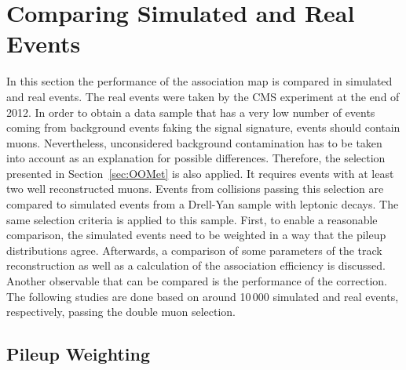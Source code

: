 \chapter{Comparing Simulated and Real Events \label{sec:DC}}

In this section the performance of the association map is compared in simulated and real events. The real events were taken by the CMS experiment at the end of 2012. In order to obtain a data sample that has a very low number of events coming from background events faking the signal signature, events should contain muons. Nevertheless, unconsidered background contamination has to be taken into account as an explanation for possible differences. Therefore, the selection presented in Section~\ref{sec:OOMet} is also applied. It requires events with at least two well reconstructed muons. Events from collisions passing this selection are compared to simulated events from a Drell-Yan sample with leptonic decays. The same selection criteria is applied to this sample. First, to enable a reasonable comparison, the simulated events need to be weighted in a way that the pileup distributions agree. Afterwards, a comparison of some parameters of the track reconstruction as well as a calculation of the association efficiency is discussed. Another observable that can be compared is the performance of the \MET{} correction. The following studies are done based on around 10\,000 simulated and real events, respectively,  passing the double muon selection.

\section{Pileup Weighting \label{sec:DCPW}}


